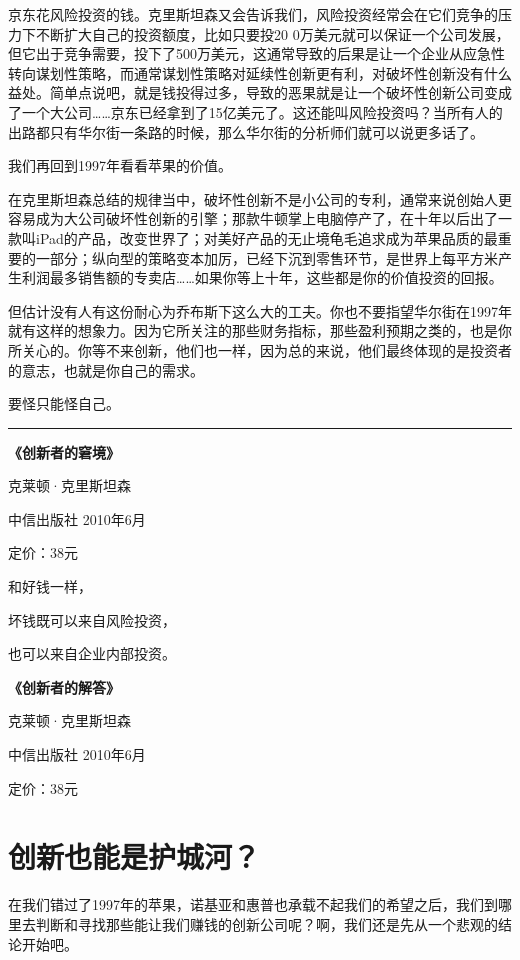 京东花风险投资的钱。克里斯坦森又会告诉我们，风险投资经常会在它们竞争的压力下不断扩大自己的投资额度，比如只要投20
0万美元就可以保证一个公司发展，但它出于竞争需要，投下了500万美元，这通常导致的后果是让一个企业从应急性转向谋划性策略，而通常谋划性策略对延续性创新更有利，对破坏性创新没有什么益处。简单点说吧，就是钱投得过多，导致的恶果就是让一个破坏性创新公司变成了一个大公司\ldots{}\ldots{}京东已经拿到了15亿美元了。这还能叫风险投资吗？当所有人的出路都只有华尔街一条路的时候，那么华尔街的分析师们就可以说更多话了。

我们再回到1997年看看苹果的价值。

在克里斯坦森总结的规律当中，破坏性创新不是小公司的专利，通常来说创始人更容易成为大公司破坏性创新的引擎；那款牛顿掌上电脑停产了，在十年以后出了一款叫iPad的产品，改变世界了；对美好产品的无止境龟毛追求成为苹果品质的最重要的一部分；纵向型的策略变本加厉，已经下沉到零售环节，是世界上每平方米产生利润最多销售额的专卖店\ldots{}\ldots{}如果你等上十年，这些都是你的价值投资的回报。

但估计没有人有这份耐心为乔布斯下这么大的工夫。你也不要指望华尔街在1997年就有这样的想象力。因为它所关注的那些财务指标，那些盈利预期之类的，也是你所关心的。你等不来创新，他们也一样，因为总的来说，他们最终体现的是投资者的意志，也就是你自己的需求。

要怪只能怪自己。

\begin{center}\rule{3in}{0.4pt}\end{center}

\textbf{《创新者的窘境》}

克莱顿·克里斯坦森

中信出版社 2010年6月

定价：38元

和好钱一样，

坏钱既可以来自风险投资，

也可以来自企业内部投资。

\textbf{《创新者的解答》}

克莱顿·克里斯坦森

中信出版社 2010年6月

定价：38元

\section{创新也能是护城河？}

在我们错过了1997年的苹果，诺基亚和惠普也承载不起我们的希望之后，我们到哪里去判断和寻找那些能让我们赚钱的创新公司呢？啊，我们还是先从一个悲观的结论开始吧。

